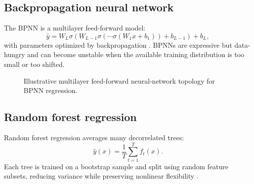\documentclass[11pt]{article}
\begin{document}
\subsection{Backpropagation neural network}
The BPNN is a multilayer feed-forward model:
\begin{equation}
\hat{y} = W_L \sigma\left(W_{L-1}\sigma\left(\cdots \sigma(W_1 x + b_1)\right)+b_{L-1}\right)+b_L,
\end{equation}
with parameters optimized by backpropagation \cite{rumelhart1986}. BPNNs are expressive but data-hungry and can become unstable when the available training distribution is too small or too shifted.

\begin{figure}[H]
\centering
{}
\caption{Illustrative multilayer feed-forward neural-network topology for BPNN regression.}
\end{figure}

\subsection{Random forest regression}
Random forest regression averages many decorrelated trees:
\begin{equation}
\hat{y}(x) = \frac{1}{T}\sum_{t=1}^{T} f_t(x).
\end{equation}
Each tree is trained on a bootstrap sample and split using random feature subsets, reducing variance while preserving nonlinear flexibility \cite{breiman2001}.
\end{document}
